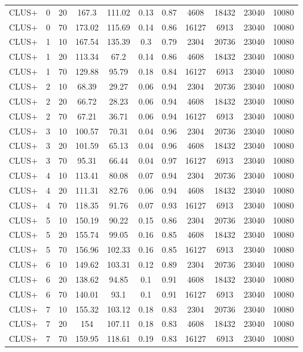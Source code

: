 \documentclass{article}
\begin{document}
\begin{appendices}
\begin{longtable}{l c c c c c c c c c c}
CLUS+ & 0 & 20 & 167.3 & 111.02 & 0.13 & 0.87 & 4608 & 18432 & 23040 & 10080 \\ 
CLUS+ & 0 & 70 & 173.02 & 115.69 & 0.14 & 0.86 & 16127 & 6913 & 23040 & 10080 \\ 
CLUS+ & 1 & 10 & 167.54 & 135.39 & 0.3 & 0.79 & 2304 & 20736 & 23040 & 10080 \\ 
CLUS+ & 1 & 20 & 113.34 & 67.2 & 0.14 & 0.86 & 4608 & 18432 & 23040 & 10080 \\ 
CLUS+ & 1 & 70 & 129.88 & 95.79 & 0.18 & 0.84 & 16127 & 6913 & 23040 & 10080 \\ 
CLUS+ & 2 & 10 & 68.39 & 29.27 & 0.06 & 0.94 & 2304 & 20736 & 23040 & 10080 \\ 
CLUS+ & 2 & 20 & 66.72 & 28.23 & 0.06 & 0.94 & 4608 & 18432 & 23040 & 10080 \\ 
CLUS+ & 2 & 70 & 67.21 & 36.71 & 0.06 & 0.94 & 16127 & 6913 & 23040 & 10080 \\ 
CLUS+ & 3 & 10 & 100.57 & 70.31 & 0.04 & 0.96 & 2304 & 20736 & 23040 & 10080 \\ 
CLUS+ & 3 & 20 & 101.59 & 65.13 & 0.04 & 0.96 & 4608 & 18432 & 23040 & 10080 \\ 
CLUS+ & 3 & 70 & 95.31 & 66.44 & 0.04 & 0.97 & 16127 & 6913 & 23040 & 10080 \\ 
CLUS+ & 4 & 10 & 113.41 & 80.08 & 0.07 & 0.94 & 2304 & 20736 & 23040 & 10080 \\ 
CLUS+ & 4 & 20 & 111.31 & 82.76 & 0.06 & 0.94 & 4608 & 18432 & 23040 & 10080 \\ 
CLUS+ & 4 & 70 & 118.35 & 91.76 & 0.07 & 0.93 & 16127 & 6913 & 23040 & 10080 \\ 
CLUS+ & 5 & 10 & 150.19 & 90.22 & 0.15 & 0.86 & 2304 & 20736 & 23040 & 10080 \\ 
CLUS+ & 5 & 20 & 155.74 & 99.05 & 0.16 & 0.85 & 4608 & 18432 & 23040 & 10080 \\ 
CLUS+ & 5 & 70 & 156.96 & 102.33 & 0.16 & 0.85 & 16127 & 6913 & 23040 & 10080 \\ 
CLUS+ & 6 & 10 & 149.62 & 103.31 & 0.12 & 0.89 & 2304 & 20736 & 23040 & 10080 \\ 
CLUS+ & 6 & 20 & 138.62 & 94.85 & 0.1 & 0.91 & 4608 & 18432 & 23040 & 10080 \\ 
CLUS+ & 6 & 70 & 140.01 & 93.1 & 0.1 & 0.91 & 16127 & 6913 & 23040 & 10080 \\ 
CLUS+ & 7 & 10 & 155.32 & 103.12 & 0.18 & 0.83 & 2304 & 20736 & 23040 & 10080 \\ 
CLUS+ & 7 & 20 & 154 & 107.11 & 0.18 & 0.83 & 4608 & 18432 & 23040 & 10080 \\ 
CLUS+ & 7 & 70 & 159.95 & 118.61 & 0.19 & 0.83 & 16127 & 6913 & 23040 & 10080 \\ 
\bottomrule
\end{longtable}


\end{appendices}



\end{document}
